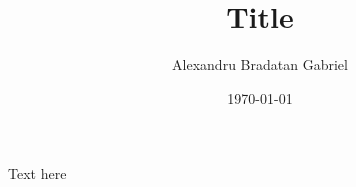 \documentclass[a4paper,11pt,oneside,dvipsnames]{article}
\title{Title}
\author{Alexandru Bradatan Gabriel}
\date{\today}
\begin{document}
\maketitle

Text here
\end{document}
